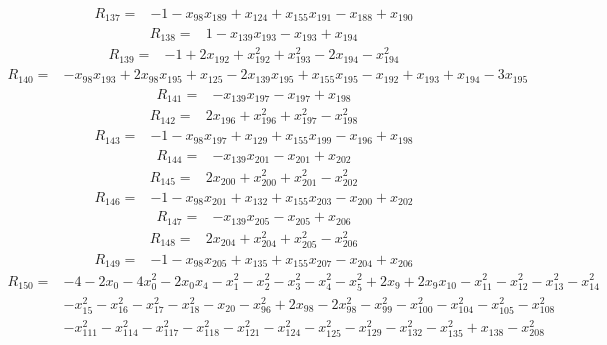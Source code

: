 \begin{align*}
 R_{137}={}&-1 -x_{98}x_{189} +x_{124} +x_{155}x_{191} -x_{188} +x_{190}
\end{align*}
\begin{align*}
 R_{138}={}&1 -x_{139}x_{193} -x_{193} +x_{194}
\end{align*}
\begin{align*}
 R_{139}={}&-1 +2x_{192} +x_{192}^{2} +x_{193}^{2} -2x_{194} -x_{194}^{2}
\end{align*}
\begin{align*}
 R_{140}={}&-x_{98}x_{193} +2x_{98}x_{195} +x_{125} -2x_{139}x_{195} +x_{155}x_{195} -x_{192} +x_{193} +x_{194} -3x_{195}
\end{align*}
\begin{align*}
 R_{141}={}&-x_{139}x_{197} -x_{197} +x_{198}
\end{align*}
\begin{align*}
 R_{142}={}&2x_{196} +x_{196}^{2} +x_{197}^{2} -x_{198}^{2}
\end{align*}
\begin{align*}
 R_{143}={}&-1 -x_{98}x_{197} +x_{129} +x_{155}x_{199} -x_{196} +x_{198}
\end{align*}
\begin{align*}
 R_{144}={}&-x_{139}x_{201} -x_{201} +x_{202}
\end{align*}
\begin{align*}
 R_{145}={}&2x_{200} +x_{200}^{2} +x_{201}^{2} -x_{202}^{2}
\end{align*}
\begin{align*}
 R_{146}={}&-1 -x_{98}x_{201} +x_{132} +x_{155}x_{203} -x_{200} +x_{202}
\end{align*}
\begin{align*}
 R_{147}={}&-x_{139}x_{205} -x_{205} +x_{206}
\end{align*}
\begin{align*}
 R_{148}={}&2x_{204} +x_{204}^{2} +x_{205}^{2} -x_{206}^{2}
\end{align*}
\begin{align*}
 R_{149}={}&-1 -x_{98}x_{205} +x_{135} +x_{155}x_{207} -x_{204} +x_{206}
\end{align*}
\begin{align*}
 R_{150}={}&-4 -2x_{0} -4x_{0}^{2} -2x_{0}x_{4} -x_{1}^{2} -x_{2}^{2} -x_{3}^{2} -x_{4}^{2} -x_{5}^{2} +2x_{9} +2x_{9}x_{10} -x_{11}^{2} -x_{12}^{2} -x_{13}^{2} -x_{14}^{2}\\
 &-x_{15}^{2} -x_{16}^{2} -x_{17}^{2} -x_{18}^{2} -x_{20} -x_{96}^{2} +2x_{98} -2x_{98}^{2} -x_{99}^{2} -x_{100}^{2} -x_{104}^{2} -x_{105}^{2} -x_{108}^{2}\\
 &-x_{111}^{2} -x_{114}^{2} -x_{117}^{2} -x_{118}^{2} -x_{121}^{2} -x_{124}^{2} -x_{125}^{2} -x_{129}^{2} -x_{132}^{2} -x_{135}^{2} +x_{138} -x_{208}^{2}
\end{align*}
